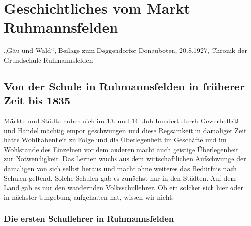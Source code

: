 \documentclass[12pt,a4paper]{book}
\begin{document}
\chapter{Geschichtliches vom Markt Ruhmannsfelden}

„Gäu und Wald“, Beilage zum Deggendorfer Donauboten, 20.8.1927, Chronik der
Grundschule Ruhmannsfelden

\section[Schule bis 1835]{Von der Schule in Ruhmannsfelden in früherer Zeit bis
1835\protect\footnotemark{}\protect{}}

Märkte und Städte haben sich im 13. und 14. Jahrhundert durch Gewerbefleiß und
Handel mächtig empor geschwungen und diese Regsamkeit in damaliger Zeit hatte
Wohlhabenheit zu Folge und die Überlegenheit im Geschäfte und im Wohlstande des
Einzelnen vor dem anderen macht auch geistige Überlegenheit zur Notwendigkeit.
Das Lernen wuchs aus dem wirtschaftlichen Aufschwunge der damaligen von sich
selbst heraus und macht ohne weiteres das Bedürfnis nach Schulen geltend. Solche
Schulen gab es zunächst nur in den Städten. Auf dem Land gab es nur den
wandernden Volksschullehrer. Ob ein solcher sich hier oder in nächster Umgebung
aufgehalten hat, wissen wir nicht.

\subsection[Die ersten Schullehrer in Ruhmannsfelden]{Die ersten Schullehrer in
Ruhmannsfelden\protect\footnotemark{}\protect{}}
\end{document}
